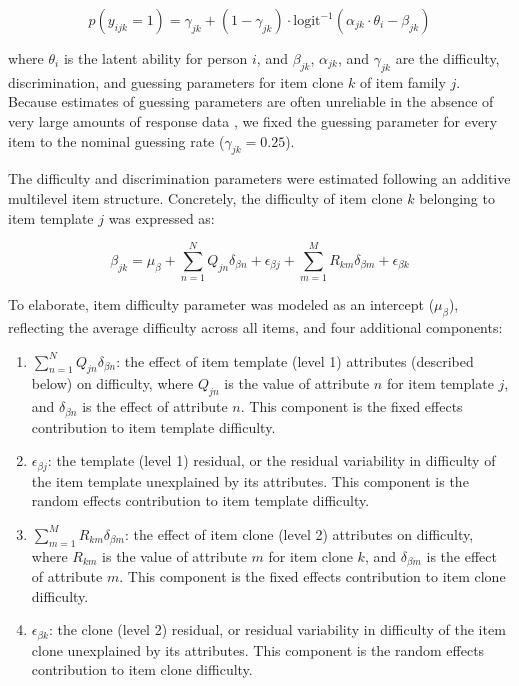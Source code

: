 \documentclass[a4paper,man,natbib]{apa6}
\begin{document}
\begin{equation} \label{eq:1}
p(y_{ijk} = 1) = \gamma_{jk} + (1-\gamma_{jk}) \cdot \text{logit}^{-1} \left( \alpha_{jk} \cdot \theta_i - \beta_{jk} \right)
\end{equation}

\noindent where $\theta_i$ is the latent ability for person $i$, and $\beta_{jk}$, $\alpha_{jk}$, and $\gamma_{jk}$ are the difficulty, discrimination, and guessing parameters for item clone $k$ of item family $j$. Because estimates of guessing parameters are often unreliable in the absence of very large amounts of response data \citep{han2012fixing}, we fixed the guessing parameter for every item to the nominal guessing rate ($\gamma_{jk} = 0.25$).

The difficulty and discrimination parameters were estimated following an additive multilevel item structure. Concretely, the difficulty of item clone $k$ belonging to item template $j$ was expressed as:  

\begin{equation}
\beta_{jk} = \mu_\beta + \sum_{n=1}^N Q_{jn} \delta_{\beta n} + \epsilon_{\beta j} + \sum_{m=1}^M R_{km} \delta_{\beta m} + \epsilon_{\beta k}
\end{equation}

\noindent To elaborate, item difficulty parameter was modeled as an intercept ($\mu_\beta$), reflecting the average difficulty across all items, and four additional components:

\begin{enumerate}

\item $\sum_{n=1}^N Q_{jn} \delta_{\beta n}$: the effect of item template (level 1) attributes (described below) on difficulty, where $Q_{jn}$ is the value of attribute $n$ for item template $j$, and $\delta_{\beta n}$ is the effect of attribute $n$. This component is the fixed effects contribution to item template difficulty.

\item $\epsilon_{\beta j}$: the template (level 1) residual, or the residual variability in difficulty of the item template unexplained by its attributes. This component is the random effects contribution to item template difficulty.

\item $\sum_{m=1}^M R_{km} \delta_{\beta m}$: the effect of item clone (level 2) attributes on difficulty, where $R_{km}$ is the value of attribute $m$ for item clone $k$, and $\delta_{\beta m}$ is the effect of attribute $m$. This component is the fixed effects contribution to item clone difficulty.

\item $\epsilon_{\beta k}$: the clone (level 2) residual, or residual variability in difficulty of the item clone unexplained by its attributes. This component is the random effects contribution to item clone difficulty.

\end{enumerate}
\end{document}
